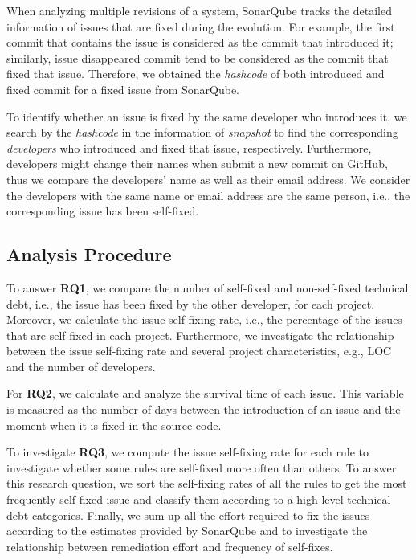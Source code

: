 \documentclass[sigconf,review]{acmart}
\begin{document}

When analyzing multiple revisions of a system, SonarQube tracks the detailed information of issues that are fixed during the evolution. For example, the first commit that contains the issue is considered as the commit that introduced it; similarly, issue disappeared commit tend to be considered as the commit that fixed that issue. Therefore, we obtained the \textit{hashcode} of both introduced and fixed commit for a fixed issue from SonarQube. 

To identify whether an issue is fixed by the same developer who introduces it, we search by the \textit{hashcode} in the information of \textit{snapshot} to find the corresponding \textit{developers} who introduced and fixed that issue, respectively. Furthermore, developers might change their names when submit a new commit on GitHub, thus we compare the developers' name as well as their email address. We consider the developers with the same name or email address are the same person, i.e., the corresponding issue has been self-fixed.



\subsection{Analysis Procedure}
\label{sec:analysis_procedure}

To answer \textbf{RQ1}, we compare the number of self-fixed and non-self-fixed technical debt, i.e., the issue has been fixed by the other developer, for each project. Moreover, we calculate the issue self-fixing rate, i.e., the percentage of the issues that are self-fixed in each project. Furthermore, we investigate the relationship between the issue self-fixing rate and several project characteristics, e.g., LOC and the number of developers.

For \textbf{RQ2}, we calculate and analyze the survival time of each issue. This variable is measured as the number of days between the introduction of an issue and the moment when it is fixed in the source code.

To investigate \textbf{RQ3}, we compute the issue self-fixing rate for each rule to investigate whether some rules are self-fixed more often than others. To answer this research question, we sort the self-fixing rates of all the rules to get the most frequently self-fixed issue and classify them according to a high-level technical debt categories. Finally, we sum up all the effort required to fix the issues according to the estimates provided by SonarQube and to investigate the relationship between remediation effort and frequency of self-fixes.




\newpage

\normalem



\vspace{12pt}
\end{document}
